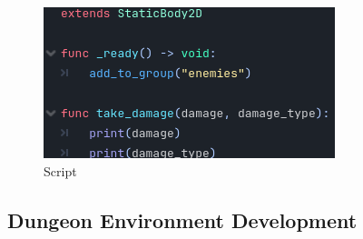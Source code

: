 \documentclass{article}
\begin{document}
\begin{multicols}{3}
                \begin{figure}[H]
                        \centering
                        \includegraphics[width = 0.9\columnwidth]{images/development/Dummy_script.PNG}
                        \caption{Script}
                \end{figure}
        \end{multicols}
        \subsection{Dungeon Environment Development}
\end{document}
